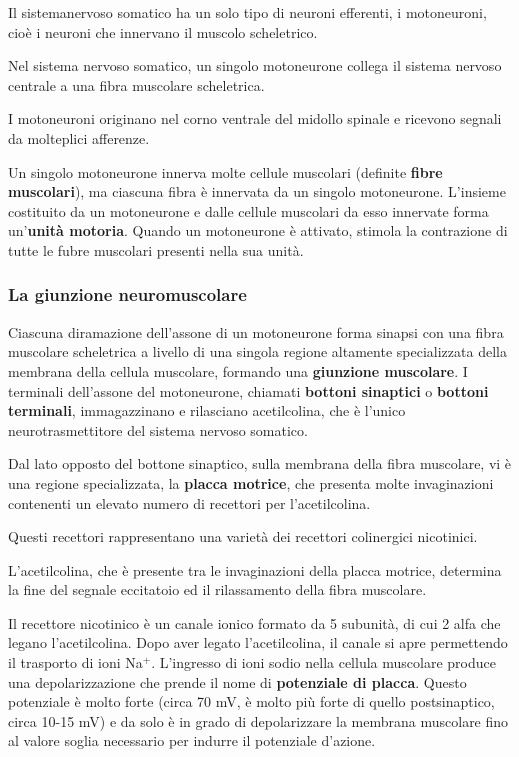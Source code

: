 \documentclass[]{article}
\begin{document}
Il sistemanervoso somatico ha un solo tipo di neuroni efferenti, i
motoneuroni, cioè i neuroni che innervano il muscolo scheletrico.

Nel sistema nervoso somatico, un singolo motoneurone collega il sistema
nervoso centrale a una fibra muscolare scheletrica.

I motoneuroni originano nel corno ventrale del midollo spinale e
ricevono segnali da molteplici afferenze.

Un singolo motoneurone innerva molte cellule muscolari (definite
\textbf{fibre muscolari}), ma ciascuna fibra è innervata da un singolo
motoneurone. L'insieme costituito da un motoneurone e dalle cellule
muscolari da esso innervate forma un'\textbf{unità motoria}. Quando un
motoneurone è attivato, stimola la contrazione di tutte le fubre
muscolari presenti nella sua unità.

\subsubsection{La giunzione
neuromuscolare}\label{la-giunzione-neuromuscolare}

Ciascuna diramazione dell'assone di un motoneurone forma sinapsi con una
fibra muscolare scheletrica a livello di una singola regione altamente
specializzata della membrana della cellula muscolare, formando una
\textbf{giunzione muscolare}. I terminali dell'assone del motoneurone,
chiamati \textbf{bottoni sinaptici} o \textbf{bottoni terminali},
immagazzinano e rilasciano acetilcolina, che è l'unico
neurotrasmettitore del sistema nervoso somatico.

Dal lato opposto del bottone sinaptico, sulla membrana della fibra
muscolare, vi è una regione specializzata, la \textbf{placca motrice},
che presenta molte invaginazioni contenenti un elevato numero di
recettori per l'acetilcolina.

Questi recettori rappresentano una varietà dei recettori colinergici
nicotinici.

L'acetilcolina, che è presente tra le invaginazioni della placca
motrice, determina la fine del segnale eccitatoio ed il rilassamento
della fibra muscolare.

Il recettore nicotinico è un canale ionico formato da 5 subunità, di cui
2 alfa che legano l'acetilcolina. Dopo aver legato l'acetilcolina, il
canale si apre permettendo il trasporto di ioni Na\(^+\). L'ingresso di
ioni sodio nella cellula muscolare produce una depolarizzazione che
prende il nome di \textbf{potenziale di placca}. Questo potenziale è
molto forte (circa 70 mV, è molto più forte di quello postsinaptico,
circa 10-15 mV) e da solo è in grado di depolarizzare la membrana
muscolare fino al valore soglia necessario per indurre il potenziale
d'azione.
\end{document}

